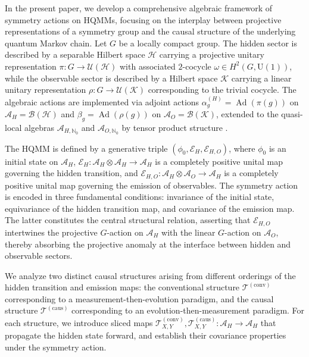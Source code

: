 \documentclass[12pt,a4paper]{article}
\begin{document}
 

In the present paper, we develop a comprehensive algebraic framework of symmetry actions on HQMMs, focusing on the interplay between projective representations of a symmetry group and the causal structure of the underlying quantum Markov chain. Let $G$ be a locally compact group. The hidden sector is described by a separable Hilbert space $\mathcal{H}$ carrying a projective unitary representation $\pi: G \to \mathcal{U}(\mathcal{H})$ with associated $2$-cocycle $\omega \in H^2(G, \mathrm{U}(1))$, while the observable sector is described by a Hilbert space $\mathcal{K}$ carrying a linear unitary representation $\rho: G \to \mathcal{U}(\mathcal{K})$ corresponding to the trivial cocycle. The algebraic actions are implemented via adjoint actions $\alpha_g^{(H)} = \operatorname{Ad}(\pi(g))$ on $\mathcal{A}_H = \mathcal{B}(\mathcal{H})$ and $\beta_g = \operatorname{Ad}(\rho(g))$ on $\mathcal{A}_O = \mathcal{B}(\mathcal{K})$, extended to the quasi-local algebras $\mathcal{A}_{H,\mathbb{N}_0}$ and $\mathcal{A}_{O,\mathbb{N}_0}$ by tensor product structure \cite{OP87, Partha12}.

The HQMM is defined by a generative triple $(\phi_0, \mathcal{E}_H, \mathcal{E}_{H,O})$, where $\phi_0$ is an initial state on $\mathcal{A}_H$, $\mathcal{E}_H: \mathcal{A}_H \otimes \mathcal{A}_H \to \mathcal{A}_H$ is a completely positive unital map \cite{choi1975completely} governing the hidden transition, and $\mathcal{E}_{H,O}: \mathcal{A}_H \otimes \mathcal{A}_O \to \mathcal{A}_H$ is a completely positive unital map governing the emission of observables. The symmetry action is encoded in three fundamental conditions: invariance of the initial state, equivariance of the hidden transition map, and covariance of the emission map. The latter constitutes the central structural relation, asserting that $\mathcal{E}_{H,O}$ intertwines the projective $G$-action on $\mathcal{A}_H$ with the linear $G$-action on $\mathcal{A}_O$, thereby absorbing the projective anomaly at the interface between hidden and observable sectors.

We analyze two distinct causal structures arising from different orderings of the hidden transition and emission maps: the conventional structure $\mathcal{T}^{(\text{conv})}$ corresponding to a measurement-then-evolution paradigm, and the causal structure $\mathcal{T}^{(\text{caus})}$ corresponding to an evolution-then-measurement paradigm. For each structure, we introduce sliced maps $\mathcal{T}_{X,Y}^{(\text{conv})}, \mathcal{T}_{X,Y}^{(\text{caus})}: \mathcal{A}_H \to \mathcal{A}_H$ that propagate the hidden state forward, and establish their covariance properties under the symmetry action.
\end{document}
